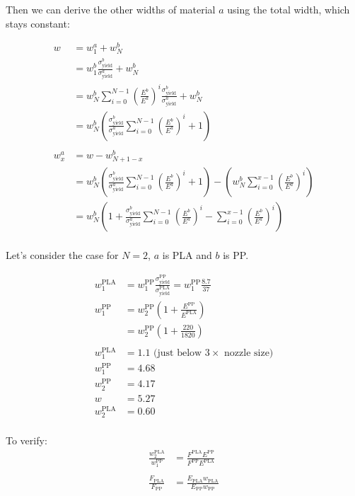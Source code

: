 Then we can derive the other widths of material $a$ using the total width, which stays constant:

\begin{align*}
	w &= w^a_1 + w^b_N \\
	&= w_1^b \frac{\sigma^b_\text{yield}}{\sigma^a_\text{yield}} + w^b_N \\
	&= w^b_N \sum\limits_{i=0}^{N-1} \left(\frac{E^b}{E^a}\right)^i \frac{\sigma^b_\text{yield}}{\sigma^a_\text{yield}} + w^b_N \\
	&= w^b_N \left( \frac{\sigma^b_\text{yield}}{\sigma^a_\text{yield}} \sum\limits_{i=0}^{N-1} \left(\frac{E^b}{E^a}\right)^i  + 1 \right) \\
	\\
	w^a_x &= w - w^b_{N+1-x} \\
	&= w^b_N \left( \frac{\sigma^b_\text{yield}}{\sigma^a_\text{yield}} \sum\limits_{i=0}^{N-1} \left(\frac{E^b}{E^a}\right)^i  + 1 \right) - \left( w^b_N \sum\limits_{i=0}^{x-1} \left(\frac{E^b}{E^a}\right)^i  \right) \\
	&= w^b_N \left( 1 + \frac{\sigma^b_\text{yield}}{\sigma^a_\text{yield}} \sum\limits_{i=0}^{N-1} \left(\frac{E^b}{E^a}\right)^i  - \sum\limits_{i=0}^{x-1} \left(\frac{E^b}{E^a}\right)^i  \right) \\
\end{align*}

\iffalse

Let's consider the case for $N=2$, $a$ is PLA and $b$ is PP.

\begin{align*}
	w_1^\text{PLA} &= w_1^\text{PP} \frac{\sigma^\text{PP}_\text{yield}}{\sigma^\text{PLA}_\text{yield}} = w_1^\text{PP} \frac{8.7}{37} \\
	w^\text{PP}_1 &=  w_2^\text{PP} \left( 1 + \frac{E^\text{PP}}{E^\text{PLA}}  \right) \\
	&=  w_2^\text{PP} \left( 1 + \frac{220}{1820}  \right) \\
	\\
	w_1^\text{PLA} &= 1.1 \text{ (just below $3\times$ nozzle size)}\\
	w_1^\text{PP} &= 4.68 \\
	w_2^\text{PP} &= 4.17 \\
	w &= 5.27 \\
	w_2^\text{PLA} &= 0.60 \\
\end{align*}

To verify:
\begin{align*}
	\frac{w_2^\text{PLA}}{w_1^\text{PP}} &= \frac{F^\text{PLA} E^\text{PP}}{F^\text{PP} E^\text{PLA}} \\
	\\
	\frac{F_\text{PLA}}{F_\text{PP}} &= \frac{E_\text{PLA} w_\text{PLA}}{E_\text{PP} w_\text{PP}} \\
\end{align*}



